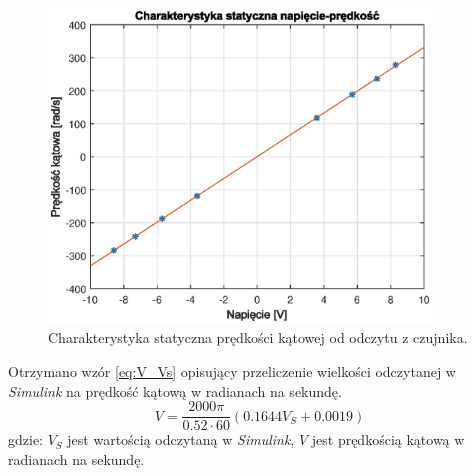 \documentclass[11pt,a4paper]{article}
\begin{document}
\begin{figure}[h]
	\centering
	\includegraphics[width=4in]{Figures/char_V_U.eps}
	\caption{Charakterystyka statyczna prędkości kątowej od odczytu z czujnika.}
	\label{fig:char_V_U}
\end{figure}

Otrzymano wzór \eqref{eq:V_Vs} opisujący przeliczenie wielkości odczytanej w \textit{Simulink} na prędkość kątową w radianach na sekundę.
\begin{equation}
V = \frac{2000\pi}{0.52\cdot 60}(0.1644V_S+0.0019)
\label{eq:V_Vs}
\end{equation}
\noindent gdzie:\newline
\(V_S\) jest wartością odczytaną w \textit{Simulink},\newline
\(V\) jest prędkością kątową w radianach na sekundę.
\end{document}
